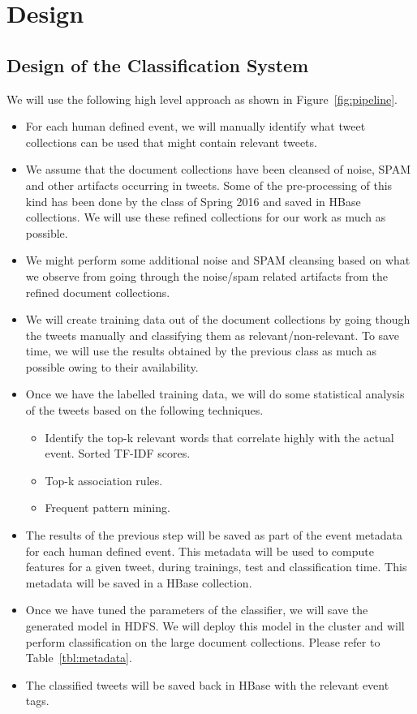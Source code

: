 \chapter{Design}
\label{chp:design}

\section{Design of the Classification System}
\label{sec:design}
 
We will use the following high level approach as shown in
Figure~\ref{fig:pipeline}.
 
\begin{itemize}
 \item {For each human defined event, we will manually identify what  tweet
collections can be used that might contain relevant tweets.}
 \item {We assume that the document collections have been cleansed of noise, SPAM and
other artifacts occurring in tweets. Some of the pre-processing of this kind
has been done by the class of Spring 2016 and saved in HBase collections. We
will use these refined collections for our work as much as possible.}
 \item {We might perform some additional noise and SPAM cleansing based on what we
observe from going through the noise/spam related artifacts from the refined
document collections.}
 \item {We will create training data out of the document collections by going though the
tweets manually and classifying them as relevant/non-relevant. To save time, we
will use the results obtained by the previous class as much as possible owing
to their availability.}
 \item {Once we have the labelled training data, we will do some statistical analysis
of the tweets based on the following techniques.}
 \begin{itemize}
  \item {Identify the top-k relevant words that correlate highly with the actual event.
Sorted TF-IDF scores.}
  \item {Top-k association rules.}
  \item {Frequent pattern mining.}
 \end{itemize}
 \item {The results of the previous step will be saved as part of the event metadata
for each human defined event. This metadata will be used to compute features
for a given tweet, during trainings, test and classification time. This
metadata will be saved in a HBase collection.}
 \item {Once we have tuned the parameters of the classifier, we will save the generated
model in HDFS. We will deploy this model in the cluster and will perform
classification on the large document collections. Please refer to Table~\ref{tbl:metadata}.}
 \item {The classified tweets will be saved back in HBase with the relevant event tags.}
\end{itemize}

